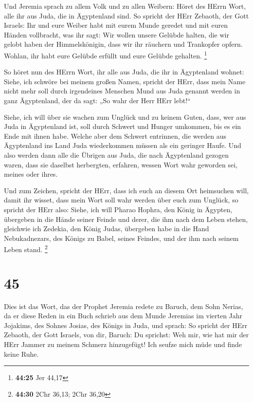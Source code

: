  Und Jeremia sprach zu allem Volk und zu allen Weibern:
Höret des HErrn Wort, alle ihr aus Juda, die in Ägyptenland sind.
 So spricht der HErr Zebaoth, der Gott Israels: Ihr und
eure Weiber habt mit eurem Munde geredet und mit euren Händen
vollbracht, was ihr sagt: Wir wollen unsere Gelübde halten, die wir
gelobt haben der Himmelskönigin, dass wir ihr räuchern und Trankopfer
opfern. Wohlan, ihr habt eure Gelübde erfüllt und eure Gelübde gehalten.
\footnote{\textbf{44:25} Jer 44,17}

 So höret nun des HErrn Wort, ihr alle aus Juda, die ihr in
Ägyptenland wohnet: Siehe, ich schwöre bei meinem großen Namen, spricht
der HErr, dass mein Name nicht mehr soll durch irgendeines Menschen Mund
aus Juda genannt werden in ganz Ägyptenland, der da sagt: „So wahr der
Herr HErr lebt!{}``

 Siehe, ich will über sie wachen zum Unglück und zu keinem
Guten, dass, wer aus Juda in Ägyptenland ist, soll durch Schwert und
Hunger umkommen, bis es ein Ende mit ihnen habe.  Welche
aber dem Schwert entrinnen, die werden aus Ägyptenland ins Land Juda
wiederkommen müssen als ein geringer Haufe. Und also werden dann alle
die Übrigen aus Juda, die nach Ägyptenland gezogen waren, dass sie
daselbst herbergten, erfahren, wessen Wort wahr geworden sei, meines
oder ihres.

 Und zum Zeichen, spricht der HErr, dass ich euch an diesem
Ort heimsuchen will, damit ihr wisset, dass mein Wort soll wahr werden
über euch zum Unglück,  so spricht der HErr also: Siehe,
ich will Pharao Hophra, den König in Ägypten, übergeben in die Hände
seiner Feinde und derer, die ihm nach dem Leben stehen, gleichwie ich
Zedekia, den König Judas, übergeben habe in die Hand Nebukadnezars, des
Königs zu Babel, seines Feindes, und der ihm nach seinem Leben stand.
\footnote{\textbf{44:30} 2Chr 36,13; 2Chr 36,20}

\hypertarget{section-10}{%
\section{45}\label{section-10}}

 Dies ist das Wort, das der Prophet Jeremia redete zu
Baruch, dem Sohn Nerias, da er diese Reden in ein Buch schrieb aus dem
Munde Jeremias im vierten Jahr Jojakims, des Sohnes Josias, des Königs
in Juda, und sprach:  So spricht der HErr Zebaoth, der Gott
Israels, von dir, Baruch:  Du sprichst: Weh mir, wie hat mir
der HErr Jammer zu meinem Schmerz hinzugefügt! Ich seufze mich müde und
finde keine Ruhe.

